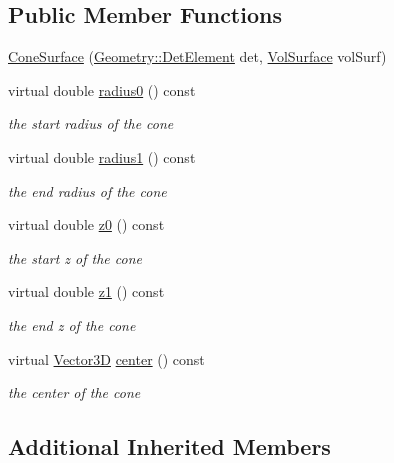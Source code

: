 \subsection*{Public Member Functions}
\begin{DoxyCompactItemize}
\item 
\hyperlink{class_d_d4hep_1_1_d_d_rec_1_1_cone_surface_ac1cbae9a5b60607333e532ffff9fb998}{Cone\+Surface} (\hyperlink{class_d_d4hep_1_1_geometry_1_1_det_element}{Geometry\+::\+Det\+Element} det, \hyperlink{class_d_d4hep_1_1_d_d_rec_1_1_vol_surface}{Vol\+Surface} vol\+Surf)
\item 
virtual double \hyperlink{class_d_d4hep_1_1_d_d_rec_1_1_cone_surface_a9115c03c32a393430c0c92bb98c7a715}{radius0} () const
\begin{DoxyCompactList}\small\item\em the start radius of the cone \end{DoxyCompactList}\item 
virtual double \hyperlink{class_d_d4hep_1_1_d_d_rec_1_1_cone_surface_aab661bae81017ac8df1914910b1e0bb5}{radius1} () const
\begin{DoxyCompactList}\small\item\em the end radius of the cone \end{DoxyCompactList}\item 
virtual double \hyperlink{class_d_d4hep_1_1_d_d_rec_1_1_cone_surface_a0bb598e6dcf760916f657335a4b34455}{z0} () const
\begin{DoxyCompactList}\small\item\em the start z of the cone \end{DoxyCompactList}\item 
virtual double \hyperlink{class_d_d4hep_1_1_d_d_rec_1_1_cone_surface_a2928c2663e6d181315172b0e3339abe0}{z1} () const
\begin{DoxyCompactList}\small\item\em the end z of the cone \end{DoxyCompactList}\item 
virtual \hyperlink{class_d_d_surfaces_1_1_vector3_d}{Vector3D} \hyperlink{class_d_d4hep_1_1_d_d_rec_1_1_cone_surface_ad3fe5b411845bd6985c049e703351843}{center} () const
\begin{DoxyCompactList}\small\item\em the center of the cone \end{DoxyCompactList}\end{DoxyCompactItemize}
\subsection*{Additional Inherited Members}


